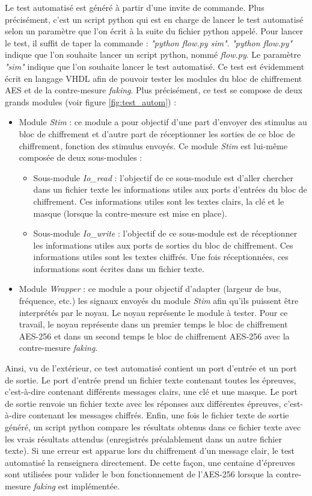 \documentclass[oneside]{book}
\begin{document}
Le test automatisé est généré à partir d'une invite de commande. Plus précisément, c'est un script python qui est en charge de lancer le test automatisé selon un paramètre que l'on écrit à la suite du fichier python appelé. Pour lancer le test, il suffit de taper la commande : \textit{"python flow.py sim"}. \textit{"python flow.py"} indique que l'on souhaite lancer un script python, nommé \textit{flow.py}. Le paramètre \textit{"sim"} indique que l'on souhaite lancer le test automatisé. Ce test est évidemment écrit en langage VHDL afin de pouvoir tester les modules du bloc de chiffrement AES et de la contre-mesure \textit{faking}. Plus précisément, ce test se compose de deux grands modules (voir figure \ref{fig:test_autom}) : 
\begin{itemize}
\item Module \textit{Stim} : ce module a pour objectif d'une part d'envoyer des stimulus au bloc de chiffrement et d'autre part de réceptionner les sorties de ce bloc de chiffrement, fonction des stimulus envoyés. Ce module \textit{Stim} est lui-même composée de deux sous-modules : 
\begin{itemize}
\item Sous-module \textit{Io\_read} : l'objectif de ce sous-module est d'aller chercher dans un fichier texte les informations utiles aux ports d'entrées du bloc de chiffrement. Ces informations utiles sont les textes clairs, la clé et le masque (lorsque la contre-mesure est mise en place).
\item Sous-module \textit{Io\_write} : l'objectif de ce sous-module est de réceptionner les informations utiles aux ports de sorties du bloc de chiffrement. Ces informations utiles sont les textes chiffrés. Une fois réceptionnées, ces informations sont écrites dans un fichier texte.
\end{itemize} 
\item Module \textit{Wrapper} : ce module a pour objectif d'adapter (largeur de bus, fréquence, etc.) les signaux envoyés du module \textit{Stim} afin qu'ils puissent être interprétés par le noyau. Le noyau représente le module à tester. Pour ce travail, le noyau représente dans un premier temps le bloc de chiffrement AES-256 et dans un second temps le bloc de chiffrement AES-256 avec la contre-mesure \textit{faking}. \\
\end{itemize}

Ainsi, vu de l'extérieur, ce test automatisé contient un port d'entrée et un port de sortie. Le port d'entrée prend un fichier texte contenant toutes les épreuves, c'est-à-dire contenant différents messages clairs, une clé et une masque. Le port de sortie renvoie un fichier texte avec les réponses aux différentes épreuves, c'est-à-dire contenant les messages chiffrés. Enfin, une fois le fichier texte de sortie généré, un script python compare les résultats obtenus dans ce fichier texte avec les vrais résultats attendus (enregistrés préalablement dans un autre fichier texte). Si une erreur est apparue lors du chiffrement d'un message clair, le test automatisé la renseignera directement. De cette façon, une centaine d'épreuves sont utilisées pour valider le bon fonctionnement de l'AES-256 lorsque la contre-mesure \textit{faking} est implémentée.
\end{document}
